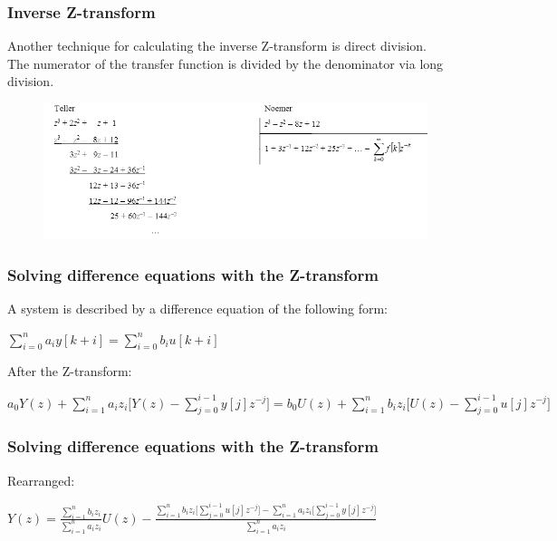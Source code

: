 \begin{frame}
	\frametitle{Inverse Z-transform}
	Another technique for calculating the inverse Z-transform is direct division.\\
	The numerator of the transfer function is divided by the denominator via long division.
	\begin{figure}
		\centering
		\includegraphics[width=0.9\linewidth]{Images/discrete_time_systems_25}
		\label{fig:discrete_time_systems_25}
	\end{figure}
	
\end{frame}
\begin{frame}
	\frametitle{Solving difference equations with the Z-transform}
	A system is described by a difference equation of the following form:
	\begin{center}
		$\sum\limits_{i=0}^n a_iy[k+i] = \sum\limits_{i=0}^n b_iu[k+i]$
	\end{center}
	After the Z-transform:
	\begin{center}
		$a_0 Y(z) + \sum\limits_{i=1}^{n} a_i z_i \Bigg[Y(z)-\sum\limits_{j=0}^{i-1}y[j]z^{-j}\Bigg] = b_0U(z)+\sum\limits_{i=1}^{n} b_i z_i \Bigg[U(z)-\sum\limits_{j=0}^{i-1}u[j]z^{-j}\Bigg]$
	\end{center}

\end{frame}
\begin{frame}
		\frametitle{Solving difference equations with the Z-transform}
		Rearranged:
		\begin{center}
			$Y(z) = \frac{\sum\limits_{i=1}^{n} b_i z_i}{\sum\limits_{i=1}^{n} a_i z_i} U(z) - \frac{\sum\limits_{i=1}^{n} b_i z_i \Bigg[\sum\limits_{j=0}^{i-1}u[j]z^{-j}\Bigg]-\sum\limits_{i=1}^{n} a_i z_i \Bigg[\sum\limits_{j=0}^{i-1}y[j]z^{-j}\Bigg]}{\sum\limits_{i=1}^{n} a_i z_i}$
		\end{center}
\end{frame}
